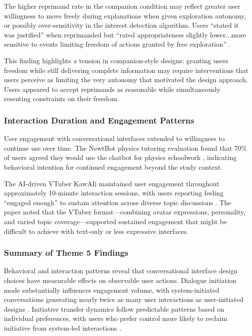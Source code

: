 \documentclass[manuscript,anonymous,sigconf]{acmart}
\begin{document}
The higher reprimand rate in the companion condition may reflect greater user willingness to move freely during explanations when given exploration autonomy, or possibly over-sensitivity in the interest detection algorithm. Users ``stated it was justified'' when reprimanded but ``rated appropriateness slightly lower...more sensitive to events limiting freedom of actions granted by free exploration'' \cite{A82}.

This finding highlights a tension in companion-style designs: granting users freedom while still delivering complete information may require interventions that users perceive as limiting the very autonomy that motivated the design approach. Users appeared to accept reprimands as reasonable while simultaneously resenting constraints on their freedom.

\subsubsection{Interaction Duration and Engagement Patterns}

User engagement with conversational interfaces extended to willingness to continue use over time. The NewtBot physics tutoring evaluation found that 70\% of users agreed they would use the chatbot for physics schoolwork \cite{A22}, indicating behavioral intention for continued engagement beyond the study context.

The AI-driven VTuber KawAIi maintained user engagement throughout approximately 10-minute interaction sessions, with users reporting feeling ``engaged enough'' to sustain attention across diverse topic discussions \cite{A81}. The paper noted that the VTuber format---combining avatar expressions, personality, and varied topic coverage---supported sustained engagement that might be difficult to achieve with text-only or less expressive interfaces.

\subsubsection{Summary of Theme 5 Findings}

Behavioral and interaction patterns reveal that conversational interface design choices have measurable effects on observable user actions. Dialogue initiation mode substantially influences engagement volume, with system-initiated conversations generating nearly twice as many user interactions as user-initiated designs \cite{A42}. Initiative transfer dynamics follow predictable patterns based on individual preferences, with users who prefer control more likely to reclaim initiative from system-led interactions \cite{A42}.
\end{document}

